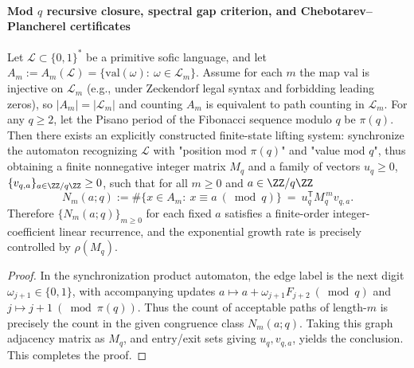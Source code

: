 \paragraph{Mod \texorpdfstring{$q$}{q} recursive closure, spectral gap criterion, and Chebotarev--Plancherel certificates}
\begin{theorem}\label{thm:gm-modq-recursion-closure}
Let \(\mathcal{L}\subset\{0,1\}^\ast\) be a primitive sofic language, and let
\(
A_m:=A_m(\mathcal{L})=\{\mathrm{val}(\omega):\ \omega\in\mathcal{L}_m\}
\).
Assume for each \(m\) the map \(\mathrm{val}\) is injective on \(\mathcal{L}_m\) (e.g., under Zeckendorf legal syntax and forbidding leading zeros), so \(|A_m|=|\mathcal{L}_m|\) and counting \(A_m\) is equivalent to path counting in \(\mathcal{L}_m\).
For any \(q\ge 2\), let the Pisano period of the Fibonacci sequence modulo \(q\) be \(\pi(q)\).
Then there exists an explicitly constructed finite-state lifting system: synchronize the automaton recognizing \(\mathcal{L}\) with "position mod \(\pi(q)\)" and "value mod \(q\)",
thus obtaining a finite nonnegative integer matrix \(M_q\) and a family of vectors \(u_q\ge 0\), \(\{v_{q,a}\}_{a\in\ZZ/q\ZZ}\ge 0\), such that for all \(m\ge 0\) and \(a\in\ZZ/q\ZZ\)
\[
N_m(a;q):=\#\{x\in A_m:\ x\equiv a\ (\bmod q)\}
\ =\ u_q^{\mathsf T}M_q^{\,m}v_{q,a}.
\]
Therefore \(\{N_m(a;q)\}_{m\ge 0}\) for each fixed \(a\) satisfies a finite-order integer-coefficient linear recurrence, and the exponential growth rate is precisely controlled by \(\rho(M_q)\).
\end{theorem}

\begin{proof}
In the synchronization product automaton, the edge label is the next digit \(\omega_{j+1}\in\{0,1\}\), with accompanying updates
\(
a\mapsto a+\omega_{j+1}F_{j+2}\ (\bmod q)
\)
and
\(
j\mapsto j+1\ (\bmod \pi(q))
\).
Thus the count of acceptable paths of length-\(m\) is precisely the count in the given congruence class \(N_m(a;q)\).
Taking this graph adjacency matrix as \(M_q\), and entry/exit sets giving \(u_q,v_{q,a}\), yields the conclusion. This completes the proof.
\end{proof}

